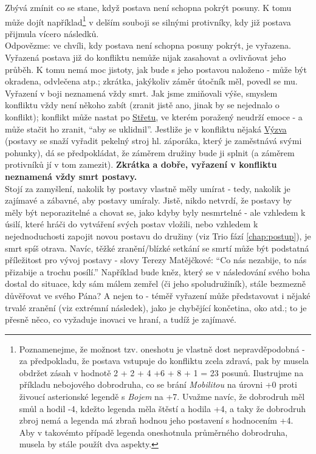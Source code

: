 Zbývá zmínit co se stane, když postava není schopna pokrýt posuny. K tomu může dojít například\footnote{Poznamenejme, že možnost tzv. oneshotu je vlastně dost nepravděpodobná - za předpokladu, že postava vstupuje do konfliktu zcela zdravá, pak by musela obdržet zásah v hodnotě 2 + 2 + 4 +6 + 8 + 1 = 23 posunů. Ilustrujme na příkladu nebojového dobrodruha, co se brání \textit{Mobilitou} na úrovni +0 proti živoucí asterionské legendě s \textit{Bojem} na +7. Uvažme navíc, že dobrodruh měl smůl a hodil -4, kdežto legenda měla štěstí a hodila +4, a taky že dobrodruh zbroj nemá a legenda má zbraň hodnou jeho postavení s hodnocením +4. Aby v takovémto případě legenda oneshotnula průměrného dobrodruha, musela by stále použít dva aspekty. } v delším souboji se silnými protivníky, kdy již postava přijmula vícero následků.\\ 
Odpovězme: ve chvíli, kdy postava není schopna posuny pokrýt, je vyřazena. Vyřazená postava již do konfliktu nemůže nijak zasahovat a ovlivňovat jeho průběh. K tomu nemá moc jistoty, jak bude s jeho postavou naloženo - může být okradena, odvlečena atp.; zkrátka, jakýkoliv záměr útočník měl, povedl se mu. \\
Vyřazení v boji neznamená vždy smrt. Jak jsme zmiňovali výše, smyslem konfliktu vždy není někoho zabít (zranit jistě ano, jinak by se nejednalo o konflikt); konflikt může nastat po \underline{Střetu}, ve kterém poražený neudrží emoce - a může stačit ho zranit, ``aby se uklidnil''. Jestliže je v konfliktu nějaká \underline{Výzva} (postavy se snaží vyřadit pekelný stroj hl. záporáka, který je zaměstnává svými pohunky), dá se předpokládat, že záměrem družiny bude ji splnit (a záměrem protivníků jí v tom zamezit). \textbf{Zkrátka a dobře, vyřazení v konfliktu neznamená vždy smrt postavy.}\\
Stojí za zamyšlení, nakolik by postavy vlastně měly umírat - tedy, nakolik je zajímavé a zábavné, aby postavy umíraly. Jistě, nikdo netvrdí, že postavy by měly být neporazitelné a chovat se, jako kdyby byly nesmrtelné - ale vzhledem k úsilí, které hráči do vytváření svých postav vložili, nebo vzhledem k nejednoduchosti zapojit novou postavu do družiny (viz Trio fází \ref{chap:postup}), je smrt spíš otrava. Navíc, těžké zranění/blízké setkání se smrtí může být podstatná příležitost pro vývoj postavy - slovy Terezy Matějčkové: ``Co nás nezabije, to nás přizabije a trochu posílí.'' Například bude kněz, který se v následování svého boha dostal do situace, kdy sám málem zemřel (či jeho spoludružiník), stále bezmezně důvěřovat ve svého Pána? A nejen to - téměř vyřazení může představovat i nějaké trvalé zranění (viz extrémní následek), jako je chybějící končetina, oko atd.; to je přesně něco, co vyžaduje inovaci ve hraní, a tudíž je zajímavé.

